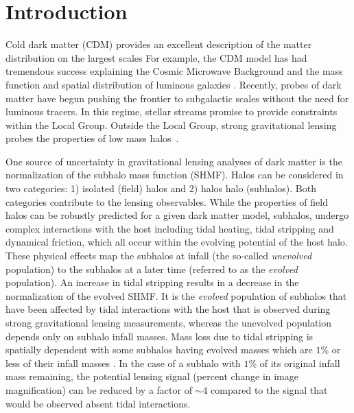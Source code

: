 \documentclass[%
 reprint,
 amsmath,
 amssymb,
 aps,
prd,
twocolumn,
superscriptaddress,
preprintnumbers,
floatfix,
nofootinbib
]{revtex4-2}
\begin{document}
\maketitle


\section{Introduction}\label{sec:introduction}
Cold dark matter (CDM) provides an excellent description of the matter distribution on the largest scales
For example, the CDM model has had tremendous success explaining the Cosmic Microwave Background \citep{2020} and the mass function and spatial distribution of luminous galaxies \citep[e.g.][]{white1978core,white1991galaxy,de2008high,weinberg2015cold}.
Recently, probes of dark matter have begun pushing the frontier to subgalactic scales without the need for luminous tracers.
In this regime, stellar streams \citep[e.g.][]{bonaca2019spur,10.1093/mnras/stab210,banik2021novel,bovy2017linear,banik2018probing} promise to provide constraints within the Local Group.
Outside the Local Group, strong gravitational lensing probes the properties of low mass halos~\citep[e.g.][]{vegetti2018constraining,minor2021unexpected,powell2023lensed, mao1998evidence,keeley2024jwst,dike2023strong,gilman2019probing, 10.1093/mnras/stz3480, gilman2022primordial, gilman2023constraining}.%

One source of uncertainty in gravitational lensing analyses of dark matter is the normalization of the subhalo mass function (SHMF).
Halos can be considered in two categories: 1) isolated (field) halos and 2) halos halo (subhalos). 
Both categories contribute to the lensing observables.
While the properties of field halos can be robustly predicted for a given dark matter model, subhalos, undergo complex interactions with the host including tidal heating, tidal stripping and dynamical friction, which all occur within the evolving potential of the host halo. 
These physical effects map the subhalos at infall (the so-called \emph{unevolved} population) to the subhalos at a later time (referred to as the \emph{evolved} population).
An increase in tidal stripping results in a decrease in the normalization of the evolved SHMF.
It is the \emph{evolved} population of subhalos that have been affected by tidal interactions with the host that is observed during strong gravitational lensing measurements, whereas the unevolved population depends only on subhalo infall masses.
Mass loss due to tidal stripping is spatially dependent \cite{10.1093/mnras/stv2900} with some subhalos having evolved masses which are $1 \%$ or less of their infall masses \cite{errani2021asymptotic}.
In the case of a subhalo with $1 \%$ of its original infall mass remaining, the potential lensing signal (percent change in image magnification) can be reduced by a factor of $\sim 4$ \cite{du2025faster} compared to the signal that would be observed absent tidal interactions.
\end{document}
